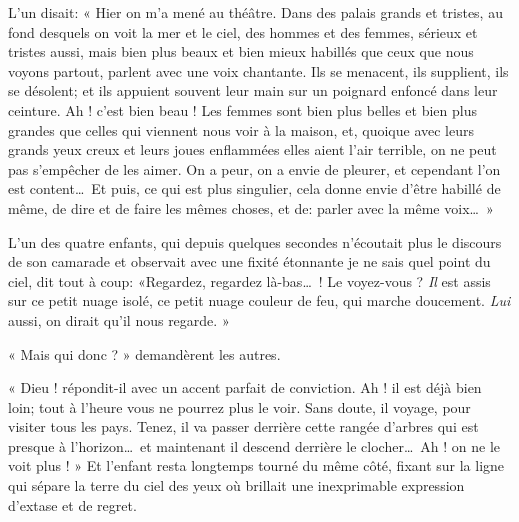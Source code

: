 L’un disait: « Hier on m’a mené au
théâtre. Dans des palais grands et tristes, au fond desquels on voit la
mer et le ciel, des hommes et des femmes, sérieux et tristes aussi,
mais bien plus beaux et bien mieux habillés que ceux que nous voyons
partout, parlent avec une voix chantante. Ils se menacent, ils
supplient, ils se désolent; et ils appuient souvent leur main sur un
poignard enfoncé dans leur ceinture. Ah ! c’est bien
beau ! Les femmes sont bien plus belles et bien plus grandes que celles
qui viennent nous voir à la maison, et, quoique avec leurs grands yeux
creux et leurs joues enflammées elles aient l’air
terrible, on ne peut pas s’empêcher de les aimer. On a
peur, on a envie de pleurer, et cependant l’on est
content\ldots\ Et puis, ce qui est plus singulier, cela donne envie
d’être habillé de même, de dire et de faire les mêmes
choses, et de: parler avec la même voix\ldots\ »

L’un des quatre enfants, qui depuis quelques secondes
n’écoutait plus le discours de son camarade et
observait avec une fixité étonnante je ne sais quel point du ciel, dit
tout à coup: «Regardez, regardez là{}-bas\ldots\ ! Le voyez{}-vous ? \textit{Il} est
assis sur ce petit nuage isolé, ce petit nuage couleur de feu, qui
marche doucement. \textit{Lui} aussi, on dirait qu’il nous
regarde. »

« Mais qui donc ? » demandèrent les autres.

« Dieu ! répondit{}-il avec un accent parfait de conviction. Ah ! il est
déjà bien loin; tout à l’heure vous ne pourrez plus le
voir. Sans doute, il voyage, pour visiter tous les pays. Tenez, il va
passer derrière cette rangée d’arbres qui est presque
à l’horizon\ldots\ et maintenant il descend derrière le
clocher\ldots\ Ah ! on ne le voit plus ! » Et l’enfant
resta longtemps tourné du même côté, fixant sur la ligne qui sépare la
terre du ciel des yeux où brillait une inexprimable expression
d’extase et de regret.

